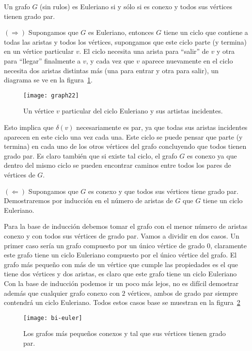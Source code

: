 \begin{teorema}\label{teo:euler}
Un grafo $G$ (sin rulos) es Euleriano si y sólo si es conexo y todos sus vértices tienen grado par.

\begin{demostracion}
$(\Rightarrow)$ Supongamos que $G$ es Euleriano, entonces $G$ tiene un ciclo que contiene a todas las aristas y todos los vértices, supongamos que este ciclo parte (y termina) en un vértice particular $v$.
El ciclo necesita una arista para ``salir'' de $v$ y otra para ``llegar'' finalmente a $v$, y cada vez que $v$ aparece nuevamente en el ciclo necesita dos aristas distintas más (una para entrar y otra para salir), un diagrama se ve en la figura~\ref{fig:graph22}.
\begin{figure}[h!]
\centering
\texttt{[image: graph22]}
\caption{Un vértice $v$ particular del ciclo Euleriano y sus artistas incidentes.}
\label{fig:graph22}
\end{figure}
Esto implica que $\delta(v)$ necesariamente es par, ya que todas sus aristas incidentes aparecen en este ciclo una vez cada una.
Este ciclo se puede pensar que parte (y termina) en cada uno de los otros vértices del grafo concluyendo que todos tienen grado par.
Es claro también que si existe tal ciclo, el grafo $G$ es conexo ya que dentro del mismo ciclo se pueden encontrar caminos entre todos los pares de vértices de $G$.

$(\Leftarrow)$ Supongamos que $G$ es conexo y que todos sus vértices tiene grado par.
Demostraremos por inducción en el número de aristas de $G$ que $G$ tiene un ciclo Euleriano.
\begin{inducciondemo}  \BI Para la base de inducción debemos tomar el grafo con el menor número de aristas conexo y con todos sus vértices de grado par.
  Vamos a dividir en dos casos.
  Un primer caso sería un grafo compuesto por un único vértice de grado $0$, claramente este grafo tiene un ciclo Euleriano compuesto por el único vértice del grafo.
	El grafo más pequeño con más de un vértice que cumple las propiedades es el que tiene dos vértices y dos aristas, es claro que este grafo tiene un ciclo Euleriano 
  Con la base de inducción podemos ir un poco más lejos, no es difícil demostrar además que cualquier grafo conexo con $2$ vértices, ambos de grado par siempre contendrá un ciclo Euleriano.
  Todos estos casos base se muestran en la figura~\ref{fig:bi-euler}
 
\begin{figure}[h!]
\centering
\texttt{[image: bi-euler]}
\caption{Los grafos más pequeños conexos y tal que sus vértices tienen grado par.}
\label{fig:bi-euler}
\end{figure}


\end{inducciondemo}
\end{demostracion}
\end{teorema}
